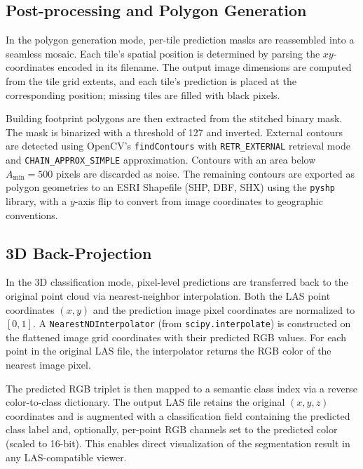 \documentclass[11pt]{article}
\begin{document}
\subsection{Post-processing and Polygon Generation}
\label{sec:method_postprocessing}

In the polygon generation mode, per-tile prediction masks are reassembled into a seamless mosaic.
Each tile's spatial position is determined by parsing the $xy$-coordinates encoded in its filename.
The output image dimensions are computed from the tile grid extents, and each tile's prediction is placed at the corresponding position; missing tiles are filled with black pixels.

Building footprint polygons are then extracted from the stitched binary mask.
The mask is binarized with a threshold of 127 and inverted.
External contours are detected using OpenCV's \texttt{findContours} with \texttt{RETR\_EXTERNAL} retrieval mode and \texttt{CHAIN\_APPROX\_SIMPLE} approximation.
Contours with an area below $A_{\min} = 500$ pixels are discarded as noise.
The remaining contours are exported as polygon geometries to an ESRI Shapefile (SHP, DBF, SHX) using the \texttt{pyshp} library, with a $y$-axis flip to convert from image coordinates to geographic conventions.

\subsection{3D Back-Projection}
\label{sec:method_backprojection}

In the 3D classification mode, pixel-level predictions are transferred back to the original point cloud via nearest-neighbor interpolation.
Both the LAS point coordinates $(x, y)$ and the prediction image pixel coordinates are normalized to $[0, 1]$.
A \texttt{NearestNDInterpolator} (from \texttt{scipy.interpolate}) is constructed on the flattened image grid coordinates with their predicted RGB values.
For each point in the original LAS file, the interpolator returns the RGB color of the nearest image pixel.

The predicted RGB triplet is then mapped to a semantic class index via a reverse color-to-class dictionary.
The output LAS file retains the original $(x, y, z)$ coordinates and is augmented with a classification field containing the predicted class label and, optionally, per-point RGB channels set to the predicted color (scaled to 16-bit).
This enables direct visualization of the segmentation result in any LAS-compatible viewer.
\end{document}
